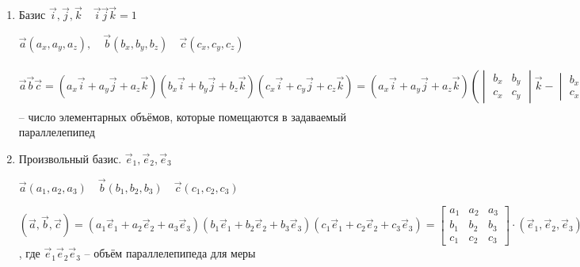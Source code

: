 \documentclass{book}
\theoremstyle{definition}
\begin{document}
\begin{enumerate}
    \item Базис $\vec i, \vec j, \vec k\quad \vec i\vec j\vec k=1$

        $\vec a(a_x, a_y, a_z),\quad \vec b(b_x, b_y, b_z)\quad \vec c(c_x, c_y, c_z)$

        $\vec a \vec b\vec c = (a_x\vec i + a_y\vec j + a_z\vec k)\left( b_x\vec i + b_y\vec j + b_z\vec k \right) \left( c_x\vec i + c_y\vec j + c_z\vec k \right) = (a_x\vec i + a_y\vec j + a_z\vec k) \left( \begin{vmatrix} b_x&b_y\\c_x&c_y \end{vmatrix} \vec k - \begin{vmatrix} b_x&b_z\\c_x&c_z \end{vmatrix}\vec j  + \begin{vmatrix} b_y&b_z\\c_y&c_z \end{vmatrix} \vec i \right)  = a_x \begin{vmatrix} b_y&b_z\\c_y&c_z \end{vmatrix} - a_y \begin{vmatrix} b_x&b_z\\c_x&c_z \end{vmatrix} + a_z \begin{vmatrix} b_x&b_y\\c_x&c_y \end{vmatrix}  = \begin{vmatrix} a_x&a_y&a_z\\b_x&b_y&b_z\\c_x&c_y&c_z \end{vmatrix} (\vec i \vec j \vec k) $ -- число элементарных объёмов, которые помещаются в задаваемый параллелепипед
    \item Произвольный базис. $\vec e_1, \vec e_2, \vec e_3$

        $\vec a(a_1, a_2, a_3)\quad \vec b(b_1, b_2, b_3)\quad \vec c (c_1, c_2, c_3)$

        $(\vec a, \vec b,\vec c) = (a_1\vec e_1 + a_2\vec e_2 + a_3\vec e_3)(b_1\vec e_1 + b_2\vec e_2 + b_3\vec e_3)(c_1\vec e_1 + c_2\vec e_2 + c_3\vec e_3) = \begin{bmatrix} a_1&a_2&a_3\\b_1&b_2&b_3\\c_1&c_2&c_3 \end{bmatrix} \cdot \left( \vec e_1, \vec e_2, \vec e_3 \right)$, где $\vec e_1 \vec e_2 \vec e_3$ -- объём параллелепипеда для меры
\end{enumerate}
\end{document}
